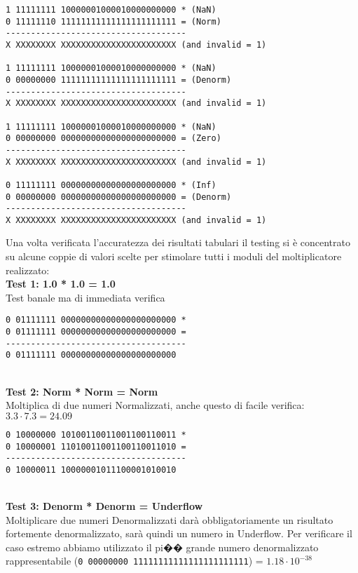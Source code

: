 \documentclass[twoside,11pt]{article}
\begin{document}
{\begin{verbatim}
1 11111111 10000001000010000000000 * (NaN)
0 11111110 11111111111111111111111 = (Norm)
------------------------------------
X XXXXXXXX XXXXXXXXXXXXXXXXXXXXXXX (and invalid = 1)

1 11111111 10000001000010000000000 * (NaN)
0 00000000 11111111111111111111111 = (Denorm)
------------------------------------
X XXXXXXXX XXXXXXXXXXXXXXXXXXXXXXX (and invalid = 1)

1 11111111 10000001000010000000000 * (NaN)
0 00000000 00000000000000000000000 = (Zero)
------------------------------------
X XXXXXXXX XXXXXXXXXXXXXXXXXXXXXXX (and invalid = 1)

0 11111111 00000000000000000000000 * (Inf)
0 00000000 00000000000000000000000 = (Denorm)
------------------------------------
X XXXXXXXX XXXXXXXXXXXXXXXXXXXXXXX (and invalid = 1)

\end{verbatim}

Una volta verificata l’accuratezza dei risultati tabulari il testing si è concentrato su alcune coppie di valori scelte per stimolare tutti i moduli del moltiplicatore realizzato:
\\
\newline
\textbf{Test 1: 1.0 * 1.0 = 1.0}
\\
Test banale ma di immediata verifica
\begin{verbatim}
0 01111111 00000000000000000000000 *
0 01111111 00000000000000000000000 =
------------------------------------
0 01111111 00000000000000000000000
\end{verbatim}

\\
\vspace{2em}
\textbf{Test 2: Norm * Norm = Norm}
\\
Moltiplica di due numeri Normalizzati, anche questo di facile verifica: $3.3 \cdot 7.3 = 24.09$
\begin{verbatim}
0 10000000 10100110011001100110011 *
0 10000001 11010011001100110011010 =
------------------------------------
0 10000011 10000001011100001010010
\end{verbatim}

\\
\vspace{2em}
\textbf{Test 3: Denorm * Denorm = Underflow}
\\
Moltiplicare due numeri Denormalizzati darà obbligatoriamente un risultato fortemente denormalizzato, sarà quindi un numero in Underflow. Per verificare il caso estremo abbiamo utilizzato il pi�� grande numero denormalizzato rappresentabile (\verb|0 00000000 11111111111111111111111|) = $1.18\cdot10^{−38}$

}
\end{document}
